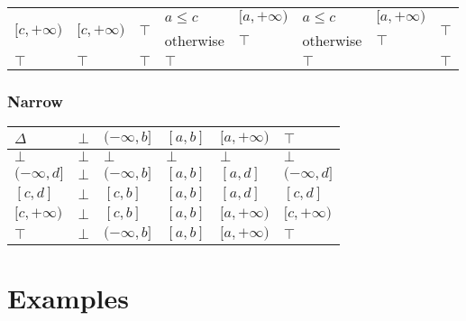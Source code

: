 \documentclass[aspectratio=169]{beamer}
\begin{document}
\begin{frame}
\begin{table}[]
{\begin{tabular}{|l|l|ll|ll|ll|l|}
    \multirow{2}{*}{$[c, +\infty)$} & \multirow{2}{*}{$[c, +\infty)$} & \multicolumn{2}{l|}{\multirow{2}{*}{$\top$}}                 & $a \le c$               & $[a, +\infty)$ & $a \le c$                  & $[a, +\infty)$                  & \multirow{2}{*}{$\top$} \\
                                    &                                 & \multicolumn{2}{l|}{}      & otherwise               & $\top$         & otherwise                  & $\top$                          &                         \\ \hline
    $\top$                          & $\top$                          & \multicolumn{2}{l|}{$\top$}                                  & \multicolumn{2}{l|}{$\top$}              & \multicolumn{2}{l|}{$\top$}                                  & $\top$                  \\ \hline
    \end{tabular}}
    \end{table}
\end{frame}

\begin{frame}
    \frametitle{Narrow}
\begin{table}[]
    \begin{tabular}{|l|l|l|l|l|l|}
    \hline
    $\Delta$       & $\bot$ & $(-\infty, b]$ & $[a, b]$ & $[a, +\infty)$ & $\top$         \\ \hline
    $\bot$         & $\bot$ & $\bot$         & $\bot$   & $\bot$         & $\bot$         \\ \hline
    $(-\infty, d]$ & $\bot$ & $(-\infty, b]$ & $[a, b]$ & $[a, d]$       & $(-\infty, d]$ \\ \hline
    $[c, d]$       & $\bot$ & $[c, b]$       & $[a, b]$ & $[a, d]$       & $[c, d]$       \\ \hline
    $[c, +\infty)$ & $\bot$ & $[c, b]$       & $[a, b]$ & $[a, +\infty)$ & $[c, +\infty)$ \\ \hline
    $\top$         & $\bot$ & $(-\infty, b]$ & $[a, b]$ & $[a, +\infty)$ & $\top$         \\ \hline
    \end{tabular}
    \end{table}
\end{frame}


\section{Examples}
\end{document}
